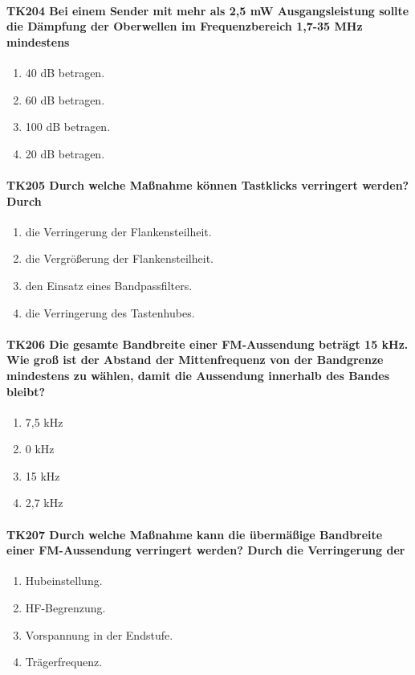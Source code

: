 \documentclass[8pt]{article}
\begin{document}
\paragraph*{TK204 Bei einem Sender mit mehr als 2,5 mW Ausgangsleistung sollte die Dämpfung der Oberwellen im Frequenzbereich 1,7-35 MHz mindestens}
\begin{enumerate}[nolistsep,label=\Alph*]
\item 40 dB betragen.
\item 60 dB betragen.
\item 100 dB betragen.
\item 20 dB betragen.
\end{enumerate}

\paragraph*{TK205 Durch welche Maßnahme können Tastklicks verringert werden? Durch} 
\begin{enumerate}[nolistsep,label=\Alph*]
\item die Verringerung der Flankensteilheit.
\item die Vergrößerung der Flankensteilheit.
\item den Einsatz eines Bandpassfilters.
\item die Verringerung des Tastenhubes.
\end{enumerate}

\paragraph*{TK206 Die gesamte Bandbreite einer FM-Aussendung beträgt 15 kHz. Wie groß ist der Abstand der Mittenfrequenz von der Bandgrenze mindestens zu wählen, damit die Aussendung innerhalb des Bandes bleibt?}
\begin{enumerate}[nolistsep,label=\Alph*]
\item 7,5 kHz
\item 0 kHz
\item 15 kHz
\item 2,7 kHz
\end{enumerate}

\paragraph*{TK207 Durch welche Maßnahme kann die übermäßige Bandbreite einer FM-Aussendung verringert werden? Durch die Verringerung der}
\begin{enumerate}[nolistsep,label=\Alph*]
\item Hubeinstellung.
\item HF-Begrenzung.
\item Vorspannung in der Endstufe.
\item Trägerfrequenz.
\end{enumerate}
\end{document}
